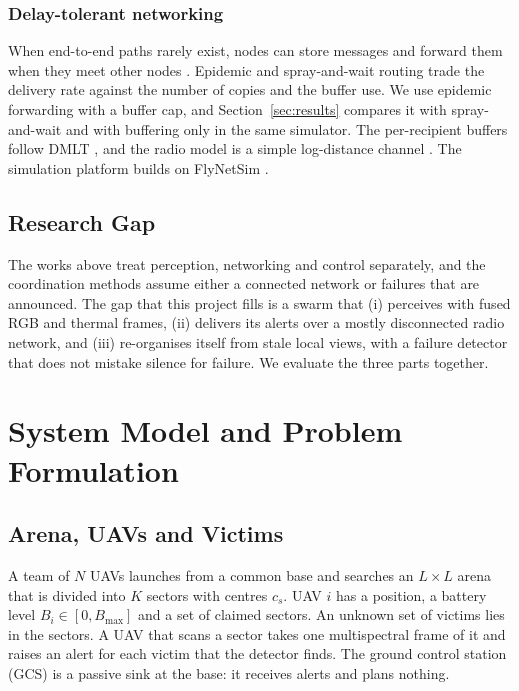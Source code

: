 \documentclass[10pt,letterpaper]{article}
\begin{document}
\subsubsection*{Delay-tolerant networking}
When end-to-end paths rarely exist, nodes can store messages and forward them when they meet other nodes \cite{fall2003dtn}. Epidemic and spray-and-wait routing \cite{vahdat2000epidemic,spyropoulos2005spray} trade the delivery rate against the number of copies and the buffer use. We use epidemic forwarding with a buffer cap, and Section~\ref{sec:results} compares it with spray-and-wait and with buffering only in the same simulator. The per-recipient buffers follow DMLT \cite{kosaka2023dmlt}, and the radio model is a simple log-distance channel \cite{rappaport2002wireless}. The simulation platform builds on FlyNetSim \cite{baidya2018flynetsim}.

\subsection{Research Gap}
The works above treat perception, networking and control separately, and the coordination methods assume either a connected network or failures that are announced. The gap that this project fills is a swarm that (i) perceives with fused RGB and thermal frames, (ii) delivers its alerts over a mostly disconnected radio network, and (iii) re-organises itself from stale local views, with a failure detector that does not mistake silence for failure. We evaluate the three parts together.

\section{System Model and Problem Formulation}\label{sec:model}
\subsection{Arena, UAVs and Victims}
A team of $N$ UAVs launches from a common base and searches an $L\times L$ arena that is divided into $K$ sectors with centres $c_s$. UAV $i$ has a position, a battery level $B_i\in[0,B_{\max}]$ and a set of claimed sectors. An unknown set of victims lies in the sectors. A UAV that scans a sector takes one multispectral frame of it and raises an alert for each victim that the detector finds. The ground control station (GCS) is a passive sink at the base: it receives alerts and plans nothing.
\end{document}
